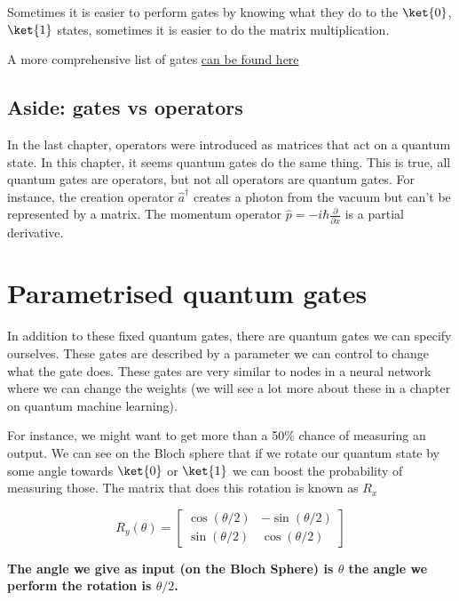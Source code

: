 \documentclass{book}
\begin{document}
Sometimes it is easier to perform gates by knowing what they do to the $\ket{0}$, $\ket{1}$ states, sometimes it is easier to do the matrix multiplication. 

A more comprehensive list of gates \href{https://raw.githubusercontent.com/qiskit-community/qiskit-textbook/main/content/ch-states/supplements/single-gates-cheatsheet.pdf}{can be found here}





\subsection{Aside: gates vs operators}

In the last chapter, operators were introduced as matrices that act on a quantum state. In this chapter, it seems quantum gates do the same thing. This is true, all quantum gates are operators, but not all operators are quantum gates. 
For instance, the creation operator $\hat{a}^\dagger$ creates a photon from the vacuum but can't be represented by a matrix. The momentum operator $\hat{p} = -i\hbar\frac{\partial}{\partial x}$ is a partial derivative. 


\section{Parametrised quantum gates }

In addition to these fixed quantum gates, there are quantum gates we can specify ourselves. These gates are described by a parameter we can control to change what the gate does. These gates are very similar to nodes in a neural network where we can change the weights (we will see a lot more about these in a chapter on quantum machine learning).

For instance, we might want to get more than a 50\% chance of measuring an output. We can see on the Bloch sphere that if we rotate our quantum state by some angle towards $\ket{0}$ or $\ket{1}$ we can boost the probability of measuring those. The matrix that does this rotation is known as $R_x$

$$
R_y(\theta) = \begin{bmatrix} \cos(\theta /2) & -\sin(\theta /2) \\ \sin(\theta /2) & \cos(\theta /2) \end{bmatrix}
$$

\textbf{The angle we give as input (on the Bloch Sphere) is $\theta$ the angle we perform the rotation is $\theta/2$.}
\end{document}
